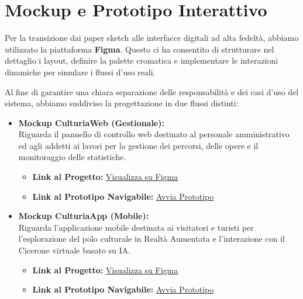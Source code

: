 \setlength{\fboxsep}{0pt}
\setlength{\fboxrule}{0.5pt}

\section{Mockup e Prototipo Interattivo}

Per la transizione dai paper sketch alle interfacce digitali ad alta fedeltà, abbiamo utilizzato la piattaforma \textbf{Figma}. Questo ci ha consentito di strutturare nel dettaglio i layout, definire la palette cromatica e implementare le interazioni dinamiche per simulare i flussi d'uso reali.

Al fine di garantire una chiara separazione delle responsabilità e dei casi d'uso del sistema, abbiamo suddiviso la progettazione in due flussi distinti:

\begin{itemize}[leftmargin=1.5em]
    \item \textbf{Mockup CulturiaWeb (Gestionale):}\\
    Riguarda il pannello di controllo web destinato al personale amministrativo ed agli addetti ai lavori per la gestione dei percorsi, delle opere e il monitoraggio delle statistiche.
    \begin{itemize}[nosep]
        \item \textbf{Link al Progetto:} \href{https://www.figma.com/design/b4OxOlmjypPuuoKpZjggYt/CulturiaWeb?node-id=0-1&t=UIdkzs5FABASGAlO-1}{Visualizza su Figma}
        \item \textbf{Link al Prototipo Navigabile:} \href{https://www.figma.com/proto/b4OxOlmjypPuuoKpZjggYt/CulturiaWeb?node-id=0-1&t=UIdkzs5FABASGAlO-1}{Avvia Prototipo}
    \end{itemize}
    
    \item \textbf{Mockup CulturiaApp (Mobile):}\\
    Riguarda l'applicazione mobile destinata ai visitatori e turisti per l'esplorazione del polo culturale in Realtà Aumentata e l'interazione con il Cicerone virtuale basato su IA.
    \begin{itemize}[nosep]
        \item \textbf{Link al Progetto:} \href{https://www.figma.com/design/m2j4i5tyZfbnyLfFhl7BG8/CulturiaApp?node-id=0-1&t=EdSut5qUvu4xhlLH-1}{Visualizza su Figma}
        \item \textbf{Link al Prototipo Navigabile:} \href{https://www.figma.com/proto/m2j4i5tyZfbnyLfFhl7BG8/CulturiaApp?node-id=0-1&t=EdSut5qUvu4xhlLH-1}{Avvia Prototipo}
    \end{itemize}
\end{itemize}

